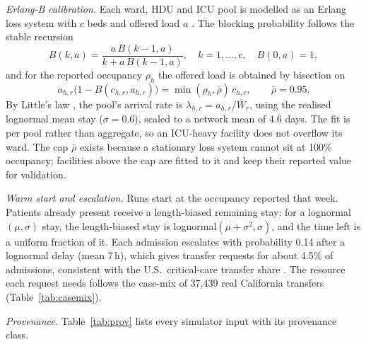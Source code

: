 \emph{Erlang-B calibration.} Each ward, HDU and ICU pool is modelled as an Erlang loss system with $c$ beds and offered load $a$ \cite{debruin2010erlang,green2002beds}. The blocking probability follows the stable recursion
\begin{equation}
  B(k,a)=\frac{a\,B(k-1,a)}{k + a\,B(k-1,a)},\quad k=1,\dots,c,\quad B(0,a)=1,
  \label{eq:erlang}
\end{equation}
and for the reported occupancy $\rho_h$ the offered load is obtained by bisection on
\begin{equation}
  a_{h,r}\bigl(1-B(c_{h,r},a_{h,r})\bigr) = \min(\rho_h,\bar\rho)\,c_{h,r},\qquad \bar\rho=0.95.
  \label{eq:inversion}
\end{equation}
By Little's law \cite{little1961proof}, the pool's arrival rate is $\lambda_{h,r}=a_{h,r}/\bar W_r$, using the realised lognormal mean stay ($\sigma=0.6$), scaled to a network mean of 4.6 days. The fit is per pool rather than aggregate, so an ICU-heavy facility does not overflow its ward. The cap $\bar\rho$ exists because a stationary loss system cannot sit at 100\% occupancy; facilities above the cap are fitted to it and keep their reported value for validation.

\emph{Warm start and escalation.} Runs start at the occupancy reported that week. Patients already present receive a length-biased remaining stay: for a lognormal$(\mu,\sigma)$ stay, the length-biased stay is lognormal$(\mu+\sigma^2,\sigma)$, and the time left is a uniform fraction of it. Each admission escalates with probability 0.14 after a lognormal delay (mean 7\,h), which gives transfer requests for about 4.5\% of admissions, consistent with the U.S.\ critical-care transfer share \cite{iwashyna2009networks}. The resource each request needs follows the case-mix of 37,439 real California transfers (Table~\ref{tab:casemix}).

\emph{Provenance.} Table~\ref{tab:prov} lists every simulator input with its provenance class.

